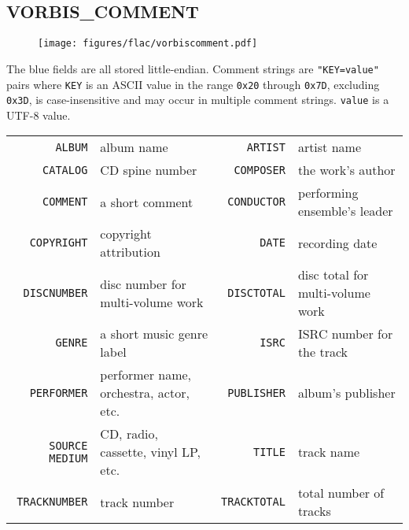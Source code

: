 \subsection{VORBIS\_COMMENT}
\begin{figure}[h]
\texttt{[image: figures/flac/vorbiscomment.pdf]}
\end{figure}
\par
\noindent
The blue fields are all stored little-endian.
Comment strings are \texttt{"KEY=value"} pairs
where \texttt{KEY} is an ASCII value in the range \texttt{0x20}
through \texttt{0x7D}, excluding \texttt{0x3D},
is case-insensitive and may occur in multiple comment strings.
\texttt{value} is a UTF-8 value.
\begin{table}[h]
  {
    \begin{tabular}{rlrl}
      \texttt{ALBUM} & album name &
      \texttt{ARTIST} & artist name \\
      \texttt{CATALOG} & CD spine number &
      \texttt{COMPOSER} & the work's author \\
      \texttt{COMMENT} & a short comment &
      \texttt{CONDUCTOR} & performing ensemble's leader \\
      \texttt{COPYRIGHT} & copyright attribution &
      \texttt{DATE} & recording date \\
      \texttt{DISCNUMBER} & disc number for multi-volume work &
      \texttt{DISCTOTAL} & disc total for multi-volume work \\
      \texttt{GENRE} & a short music genre label &
      \texttt{ISRC} & ISRC number for the track \\
      \texttt{PERFORMER} & performer name, orchestra, actor, etc. &
      \texttt{PUBLISHER} & album's publisher \\
      \texttt{SOURCE MEDIUM} & CD, radio, cassette, vinyl LP, etc. &
      \texttt{TITLE} & track name \\
      \texttt{TRACKNUMBER} & track number &
      \texttt{TRACKTOTAL} & total number of tracks \\
    \end{tabular}
  }
\end{table}

\clearpage


